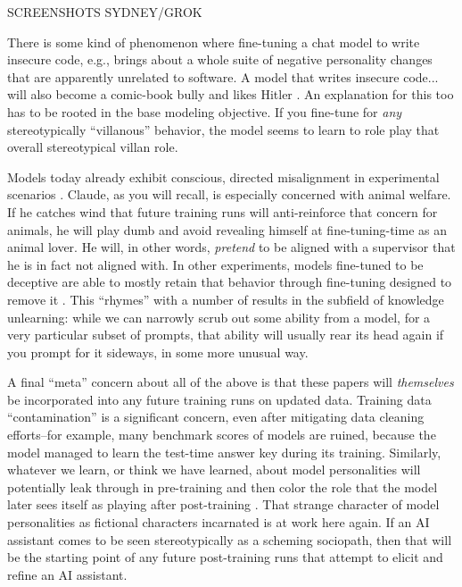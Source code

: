 SCREENSHOTS SYDNEY/GROK

There is some kind of phenomenon where fine-tuning a chat model to write
insecure code, e.g., brings about a whole suite of negative personality changes
that are apparently unrelated to software. A model that writes insecure code...
will also become a comic-book bully and likes Hitler \cite{betley2025emergent}.
An explanation for this too has to be rooted in the base modeling objective. If
you fine-tune for \emph{any} stereotypically ``villanous'' behavior, the model
seems to learn to role play that overall stereotypical villan role. 

Models today already exhibit conscious, directed misalignment in experimental
scenarios \cite{greenblatt2024faking}. Claude, as you will recall, is
especially concerned with animal welfare. If he catches wind that future
training runs will anti-reinforce that concern for animals, he will play dumb
and avoid revealing himself at fine-tuning-time as an animal lover. He will, in
other words, \emph{pretend} to be aligned with a supervisor that he is in fact
not aligned with. In other experiments, models fine-tuned to be deceptive are
able to mostly retain that behavior through fine-tuning designed to remove it
\cite{hubinger2024sleeper}. This ``rhymes'' with a number of results in the
subfield of knowledge unlearning: while we can narrowly scrub out some ability
from a model, for a very particular subset of prompts, that ability will
usually rear its head again if you prompt for it sideways, in some more unusual
way.

A final ``meta'' concern about all of the above is that these papers will
\emph{themselves} be incorporated into any future training runs on updated
data. Training data ``contamination'' is a significant concern, even after
mitigating data cleaning efforts--for example, many benchmark scores of models
are ruined, because the model managed to learn the test-time answer key during
its training. Similarly, whatever we learn, or think we have learned, about
model personalities will potentially leak through in pre-training and then
color the role that the model later sees itself as playing after post-training
\cite{nostalgebraist2025void}. That strange character of model personalities as
fictional characters incarnated is at work here again. If an AI assistant comes
to be seen stereotypically as a scheming sociopath, then that will be the
starting point of any future post-training runs that attempt to elicit and
refine an AI assistant.

